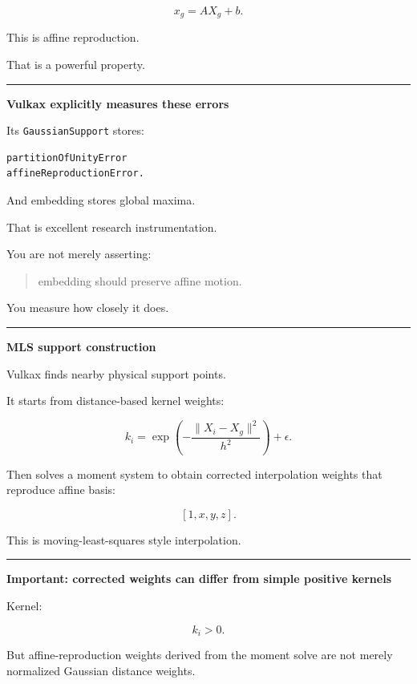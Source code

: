 \[
\boxed{
x_g=AX_g+b.
}
\]

This is affine reproduction.

That is a powerful property.

\begin{center}\rule{0.5\linewidth}{0.5pt}\end{center}

\textbf{Vulkax explicitly measures these errors}

Its \texttt{GaussianSupport} stores:

\protect{}\label{5d4p4w}%
\begin{verbatim}
partitionOfUnityError
affineReproductionError.
\end{verbatim}

And embedding stores global maxima.

That is excellent research instrumentation.

You are not merely asserting:

\begin{quote}
embedding should preserve affine motion.
\end{quote}

You measure how closely it does.

\begin{center}\rule{0.5\linewidth}{0.5pt}\end{center}

\textbf{MLS support construction}

Vulkax finds nearby physical support points.

It starts from distance-based kernel weights:

\[
k_i
=
\exp
\left(
-\frac{
\|X_i-X_g\|^2
}{
h^2
}
\right)
+\epsilon.
\]

Then solves a moment system to obtain corrected interpolation weights that reproduce affine basis:

\[
[1,x,y,z].
\]

This is moving-least-squares style interpolation.

\begin{center}\rule{0.5\linewidth}{0.5pt}\end{center}

\textbf{Important: corrected weights can differ from simple positive kernels}

Kernel:

\[
k_i>0.
\]

But affine-reproduction weights derived from the moment solve are not merely normalized Gaussian distance weights.

